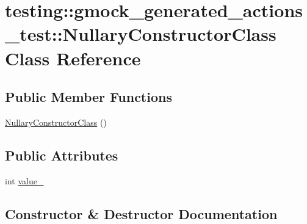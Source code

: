 \hypertarget{classtesting_1_1gmock__generated__actions__test_1_1_nullary_constructor_class}{}\section{testing\+:\+:gmock\+\_\+generated\+\_\+actions\+\_\+test\+:\+:Nullary\+Constructor\+Class Class Reference}
\label{classtesting_1_1gmock__generated__actions__test_1_1_nullary_constructor_class}
\subsection*{Public Member Functions}
\begin{DoxyCompactItemize}
\item 
\hyperlink{classtesting_1_1gmock__generated__actions__test_1_1_nullary_constructor_class_a8ad709e8d6c391958907dafea12d38a2}{Nullary\+Constructor\+Class} ()
\end{DoxyCompactItemize}
\subsection*{Public Attributes}
\begin{DoxyCompactItemize}
\item 
int \hyperlink{classtesting_1_1gmock__generated__actions__test_1_1_nullary_constructor_class_aa877ccc5aff335cbf81b8de90abee732}{value\+\_\+}
\end{DoxyCompactItemize}


\subsection{Constructor \& Destructor Documentation}
\mbox{\label{classtesting_1_1gmock__generated__actions__test_1_1_nullary_constructor_class_a8ad709e8d6c391958907dafea12d38a2}} 
